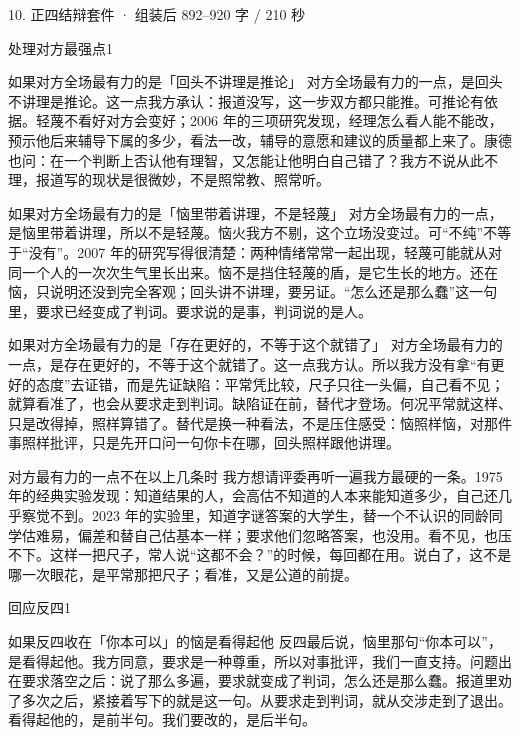 \documentclass[script,pro]{debate}
\begin{document}
\begin{kit}{10. 正四结辩}{套件 · 组装后 892–920 字 / 210 秒}
\begin{pick}{处理对方最强点}{1}
\begin{module}{如果对方全场最有力的是「回头不讲理是推论」}
对方全场最有力的一点，是回头不讲理是推论。这一点我方承认：报道没写，这一步双方都只能推。可推论有依据。轻蔑不看好对方会变好；2006 年的三项研究发现，经理怎么看人能不能改，预示他后来辅导下属的多少，看法一改，辅导的意愿和建议的质量都上来了。康德也问：在一个判断上否认他有理智，又怎能让他明白自己错了？我方不说从此不理，报道写的现状是很微妙，不是照常教、照常听。
\end{module}
\begin{module}{如果对方全场最有力的是「恼里带着讲理，不是轻蔑」}
对方全场最有力的一点，是恼里带着讲理，所以不是轻蔑。恼火我方不剔，这个立场没变过。可“不纯”不等于“没有”。2007 年的研究写得很清楚：两种情绪常常一起出现，轻蔑可能就从对同一个人的一次次生气里长出来。恼不是挡住轻蔑的盾，是它生长的地方。还在恼，只说明还没到完全客观；回头讲不讲理，要另证。“怎么还是那么蠢”这一句里，要求已经变成了判词。要求说的是事，判词说的是人。
\end{module}
\begin{module}{如果对方全场最有力的是「存在更好的，不等于这个就错了」}
对方全场最有力的一点，是存在更好的，不等于这个就错了。这一点我方认。所以我方没有拿“有更好的态度”去证错，而是先证缺陷：平常凭比较，尺子只往一头偏，自己看不见；就算看准了，也会从要求走到判词。缺陷证在前，替代才登场。何况平常就这样、只是改得掉，照样算错了。替代是换一种看法，不是压住感受：恼照样恼，对那件事照样批评，只是先开口问一句你卡在哪，回头照样跟他讲理。
\end{module}
\begin{fallback}{对方最有力的一点不在以上几条时}
我方想请评委再听一遍我方最硬的一条。1975 年的经典实验发现：知道结果的人，会高估不知道的人本来能知道多少，自己还几乎察觉不到。2023 年的实验里，知道字谜答案的大学生，替一个不认识的同龄同学估难易，偏差和替自己估基本一样；要求他们忽略答案，也没用。看不见，也压不下。这样一把尺子，常人说“这都不会？”的时候，每回都在用。说白了，这不是哪一次眼花，是平常那把尺子；看准，又是公道的前提。
\end{fallback}
\end{pick}
\begin{pick}{回应反四}{1}
\begin{module}{如果反四收在「你本可以」的恼是看得起他}
反四最后说，恼里那句“你本可以”，是看得起他。我方同意，要求是一种尊重，所以对事批评，我们一直支持。问题出在要求落空之后：说了那么多遍，要求就变成了判词，怎么还是那么蠢。报道里劝了多次之后，紧接着写下的就是这一句。从要求走到判词，就从交涉走到了退出。看得起他的，是前半句。我们要改的，是后半句。
\end{module}

\end{pick}
\end{kit}
\end{document}
